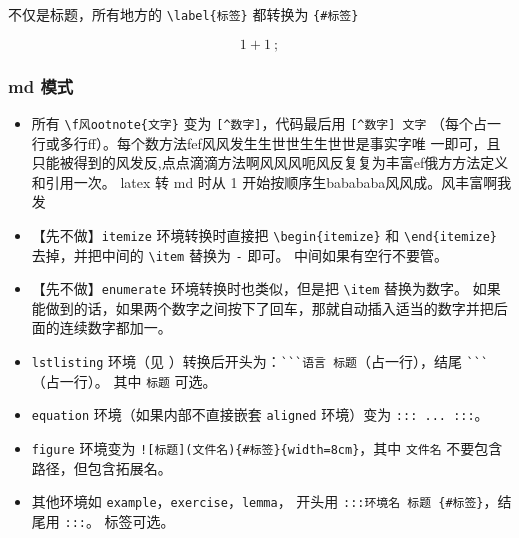 
不仅是标题，所有地方的 \verb`\label{标签}` 都转换为 \verb`{#标签}`

\begin{equation}
1+1~;
\end{equation}

\subsubsection{md 模式}
\begin{itemize}

\subsubsection{文章信息}文章信息风发
风f
\item 所有 \verb`\f风ootnote{文字}` 变为 \verb`[^数字]`，代码最后用 \verb`[^数字] 文字` （每个占一行或多行ff）。每个数方法fef风风发生生世世生生世世是事实字唯 一即可，且只能被得到的风发反,点点滴滴方法啊风风风呃风反复复为丰富ef俄方方法定义和引用一次。 latex 转 md 时从 1 开始按顺序生babababa风风成。风丰富啊我发



\item 【先不做】\verb`itemize` 环境转换时直接把 \verb`\begin{itemize}` 和 \verb`\end{itemize}` 去掉，并把中间的 \verb`\item` 替换为 \verb`-` 即可。 中间如果有空行不要管。
\item 【先不做】\verb`enumerate` 环境转换时也类似，但是把 \verb`\item` 替换为数字。 如果能做到的话，如果两个数字之间按下了回车，那就自动插入适当的数字并把后面的连续数字都加一。
\item \verb`lstlisting` 环境（见 ）转换后开头为：\verb|```语言 标题|（占一行），结尾 \verb|```|（占一行）。 其中 \verb`标题` 可选。



\item \verb`equation` 环境（如果内部不直接嵌套 \verb`aligned` 环境）变为 \verb`::: ... :::`。
\item \verb`figure` 环境变为 \verb`![标题](文件名){#标签}{width=8cm}`，其中 \verb`文件名` 不要包含路径，但包含拓展名。
\item 其他环境如 \verb`example`，\verb`exercise`，\verb`lemma`， 开头用 \verb`:::环境名 标题 {#标签}`，结尾用 \verb`:::`。 标签可选。
\end{itemize}

